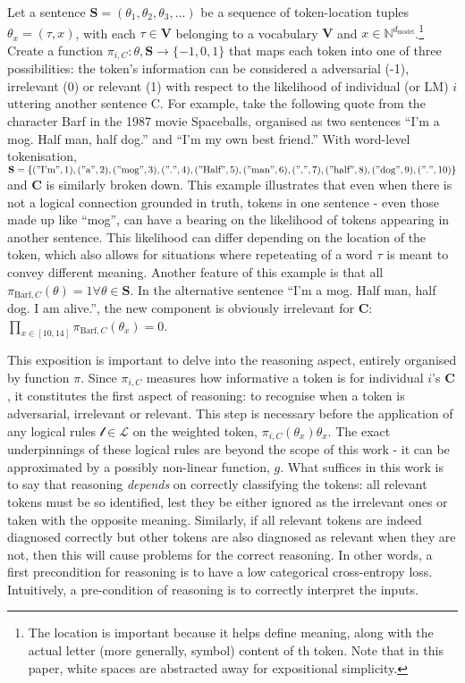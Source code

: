 \documentclass[
]{article}
\begin{document}
Let a sentence \(\mathbf{S} = (\theta_1, \theta_2, \theta_3, ...)\) be a
sequence of token-location tuples \(\theta_x = (\tau, x)\), with each
\(\tau \in \mathbf{V}\) belonging to a vocabulary \(\mathbf{V}\) and
\(x \in \mathbb{N}^{d_{\text{model}}}\).\footnote{The location is
  important because it helps define meaning, along with the actual
  letter (more generally, symbol) content of th token. Note that in this
  paper, white spaces are abstracted away for expositional simplicity.}
Create a function \(\pi_{i, C} : \theta, \mathbf{S} \to \{-1, 0, 1\}\)
that maps each token into one of three possibilities: the token's
information can be considered a adversarial (-1), irrelevant (0) or
relevant (1) with respect to the likelihood of individual (or LM) \(i\)
uttering another sentence C. For example, take the following quote from
the character Barf in the 1987 movie Spaceballs, organised as two
sentences ``I'm a mog. Half man, half dog.'' and ``I'm my own best
friend.'' With word-level tokenisation,
\(\mathbf{S} = \{("\text{I'm}", 1), ("\text{a}", 2), ("\text{mog}", 3), ("\text{.}", 4), ("\text{Half}", 5), ("\text{man}", 6), ("\text{,}", 7), ("\text{half}", 8), ("\text{dog}", 9), ("\text{.}", 10)\}\)
and \(\mathbf{C}\) is similarly broken down. This example illustrates
that even when there is not a logical connection grounded in truth,
tokens in one sentence - even those made up like ``mog'', can have a
bearing on the likelihood of tokens appearing in another sentence. This
likelihood can differ depending on the location of the token, which also
allows for situations where repeteating of a word \(\tau\) is meant to
convey different meaning. Another feature of this example is that all
\(\pi_{\text{Barf}, C}(\theta) = 1 \forall \theta \in \mathbf{S}\). In
the alternative sentence ``I'm a mog. Half man, half dog. I am alive.'',
the new component is obviously irrelevant for \(\mathbf{C}\):
\(\prod_{x \in [10, 14]} \pi_{\text{Barf}, C}(\theta_x) = 0\).

This exposition is important to delve into the reasoning aspect,
entirely organised by function \(\pi\). Since \(\pi_{i, C}\) measures
how informative a token is for individual \(i\)'s \(\mathbf{C}\), it
constitutes the first aspect of reasoning: to recognise when a token is
adversarial, irrelevant or relevant. This step is necessary before the
application of any logical rules \(\mathcal{l} \in \mathcal{L}\) on the
weighted token, \(\pi_{i, C}(\theta_x) \theta_x\). The exact
underpinnings of these logical rules are beyond the scope of this work -
it can be approximated by a possibly non-linear function, \(g\). What
suffices in this work is to say that reasoning \emph{depends} on
correctly classifying the tokens: all relevant tokens must be so
identified, lest they be either ignored as the irrelevant ones or taken
with the opposite meaning. Similarly, if all relevant tokens are indeed
diagnosed correctly but other tokens are also diagnosed as relevant when
they are not, then this will cause problems for the correct reasoning.
In other words, a first precondition for reasoning is to have a low
categorical cross-entropy loss. Intuitively, a pre-condition of
reasoning is to correctly interpret the inputs.
\end{document}
